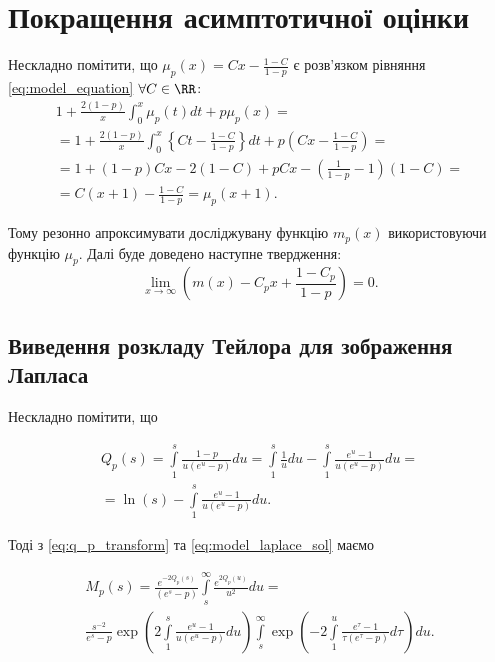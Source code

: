 \section{Покращення асимптотичної оцінки}

Нескладно помітити, що $\mu_{p}(x) = C x - \frac{1-C}{1 - p}$ є розв'язком рівняння \eqref{eq:model_equation} $\forall C \in \RR$:
\begin{gather*}
1 + \frac{2 (1-p)}{x} \int_{0}^{x} \mu_{p}(t) dt + p\mu_{p}(x) = \\
=1 + \frac{2 (1-p)}{x} \int_{0}^{x} \left\{C t - \frac{1 - C}{1 - p} \right\} dt + p \left( C x - \frac{1 - C}{1 - p}\right) = \\
=1 + (1 - p) C x - 2(1 - C) + p C x - (\frac{1}{1 - p} - 1)(1 - C) = \\
= C(x + 1) - \frac{1 - C}{1 - p} = \mu_{p}(x+1).
\end{gather*}

Тому резонно апроксимувати досліджувану функцію $m_{p}(x)$ використовуючи функцію $\mu_{p}$. Далі буде доведено наступне твердження:
\begin{equation}
\label{eq:fine_asymptotics_1}
\lim\limits_{x \rightarrow \infty} \left( m(x) - C_{p} x + \frac{1 - C_{p}}{1 - p} \right) = 0.
\end{equation}

\subsection{Виведення розкладу Тейлора для зображення Лапласа}

Нескладно помітити, що

\begin{equation}
\label{eq:q_p_transform}
\begin{gathered}
Q_{p}(s) = \int\limits_{1}^{s} \frac{1-p}{u(e^u - p)} du = \int\limits_{1}^{s} \frac{1}{u} du - \int\limits_{1}^{s} \frac{e^u -1}{u(e^u - p)} du = \\
= \ln(s) - \int\limits_{1}^{s} \frac{e^u -1}{u(e^u - p)} du.
\end{gathered}
\end{equation}

Тоді з \eqref{eq:q_p_transform} та \eqref{eq:model_laplace_sol} маємо

\begin{gather*}
M_{p}(s) =\frac{e^{-2Q_p(s)}}{(e^s - p)} \int\limits_s^\infty \frac{e^{2Q_p(u)}}{u^2} du = \\
\frac{s^{-2}}{e^s-p} \exp \left(2 \int\limits_{1}^{s} \frac{e^u -1}{u(e^u - p)} du\right) \int\limits_s^\infty \exp\left(-2 \int\limits_{1}^{u} \frac{e^\tau -1}{\tau(e^\tau - p)} d\tau\right) du.
\end{gather*}

